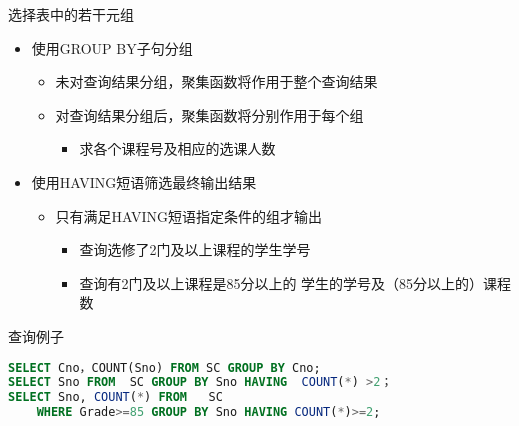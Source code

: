 \begin{frame}[fragile]{选择表中的若干元组}
\begin{itemize}
    \item 使用GROUP BY子句分组  
    \begin{itemize}
        \item 未对查询结果分组，聚集函数将作用于整个查询结果
        \item 对查询结果分组后，聚集函数将分别作用于每个组 
        \begin{itemize}
        \item 求各个课程号及相应的选课人数
        \end{itemize}
    \end{itemize}
    \item 使用HAVING短语筛选最终输出结果
    \begin{itemize}
        \item 只有满足HAVING短语指定条件的组才输出
        \begin{itemize}
            \item 查询选修了2门及以上课程的学生学号
            \item 查询有2门及以上课程是85分以上的
          学生的学号及（85分以上的）课程数 
        \end{itemize}
    \end{itemize}
    
\end{itemize}

\begin{block}{查询例子}
\begin{lstlisting}[language=SQL]
SELECT Cno，COUNT(Sno) FROM SC GROUP BY Cno;
SELECT Sno FROM  SC GROUP BY Sno HAVING  COUNT(*) >2； 
SELECT Sno, COUNT(*) FROM   SC
    WHERE Grade>=85 GROUP BY Sno HAVING COUNT(*)>=2;


\end{lstlisting}
\end{block}
\end{frame}



